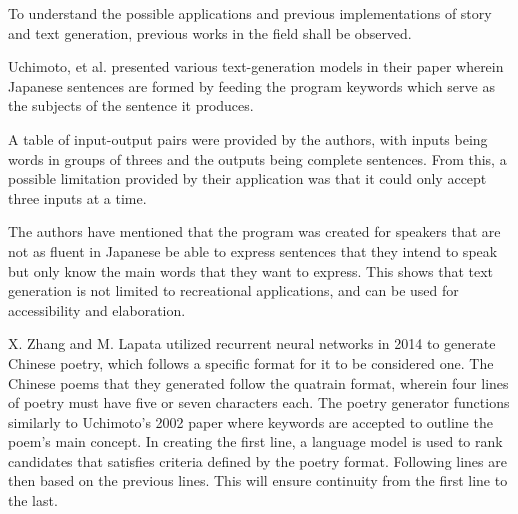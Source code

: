 \documentclass[journal]{./IEEE/IEEEtran}
\begin{document}






To understand the possible applications and previous implementations of story and text generation, previous works in the field shall be observed.

Uchimoto, et al. presented various text-generation models in their paper wherein Japanese sentences are formed by feeding the program keywords which serve as the subjects of the sentence it produces. \cite{UKIHSS2002} 

A table of input-output pairs were provided by the authors, with inputs being words in groups of threes and the outputs being complete sentences. From this, a possible limitation provided by their application was that it could only accept three inputs at a time.

The authors have mentioned that the program was created for speakers that are not as fluent in Japanese be able to express sentences that they intend to speak but only know the main words that they want to express. This shows that text generation is not limited to recreational applications, and can be used for accessibility and elaboration. %

\pubidadjcol
X. Zhang and M. Lapata utilized recurrent neural networks in 2014 to generate Chinese poetry, which follows a specific format for it to be considered one.
\cite{ZXLM2014}
The Chinese poems that they generated follow the quatrain format, wherein four lines of poetry must have five or seven characters each.
The poetry generator functions similarly to Uchimoto's 2002 paper where keywords are accepted to outline the poem's main concept.
In creating the first line, a language model is used to rank candidates that satisfies criteria defined by the poetry format. Following lines are then based on the previous lines. This will ensure continuity from the first line to the last.
\end{document}
